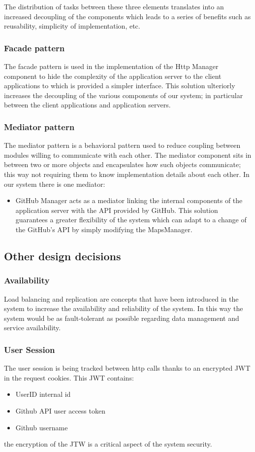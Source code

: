 \documentclass{article}
\begin{document}
The distribution of tasks between these three elements translates into an increased decoupling of the components which leads to a series of benefits such as reusability, simplicity of implementation, etc.
\subsubsection{Facade pattern}
The facade pattern is used in the implementation of the Http Manager component to hide the complexity of the application server to the client applications to which is provided a simpler interface. This solution ulteriorly increases the decoupling of the various components of our system; in particular between the client applications and application servers.
\subsubsection{Mediator pattern}
The mediator pattern is a behavioral pattern used to reduce coupling between modules willing to communicate with each other. The mediator component sits in between two or more objects and encapsulates how such objects communicate; this way not requiring them to know implementation details about each other. In our system there is one mediator:
\begin{itemize}
\item GitHub Manager acts as a mediator linking the internal components of the application server with the API provided by GitHub. This solution guarantees a greater flexibility of the system which can adapt to a change of the GitHub’s API by simply modifying the MapsManager.
\end{itemize}
\subsection{Other design decisions}
\subsubsection{Availability}
Load balancing and replication are concepts that have been introduced in the system to
increase the availability and reliability of the system. In this way the system would be as
fault-tolerant as possible regarding data management and service availability.
\subsubsection{User Session}
The user session is being tracked between http calls thanks to an encrypted JWT in the request cookies. This JWT contains:
\begin{itemize}
\item UserID internal id
\item Github API user access token
\item Github username
\end{itemize}
the encryption of the JTW is a critical aspect of the system security.
\end{document}
